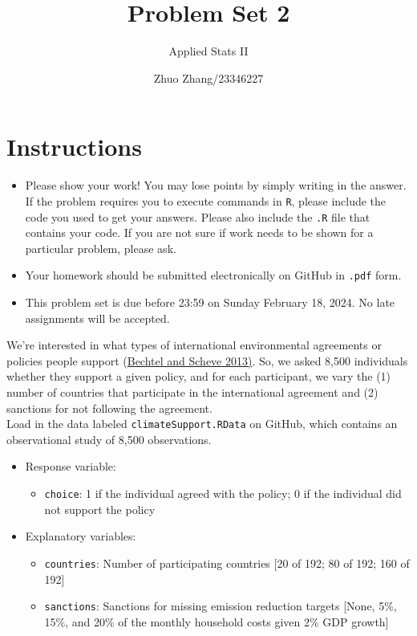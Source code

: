\documentclass[12pt,letterpaper]{article}
\title{Problem Set 2}
\date{Zhuo Zhang/23346227}
\author{Applied Stats II}
\begin{document}
	\maketitle
	\section*{Instructions}
	\begin{itemize}
		\item Please show your work! You may lose points by simply writing in the answer. If the problem requires you to execute commands in \texttt{R}, please include the code you used to get your answers. Please also include the \texttt{.R} file that contains your code. If you are not sure if work needs to be shown for a particular problem, please ask.
		\item Your homework should be submitted electronically on GitHub in \texttt{.pdf} form.
		\item This problem set is due before 23:59 on Sunday February 18, 2024. No late assignments will be accepted.
	\end{itemize}

	\vspace{.25cm}
\noindent We're interested in what types of international environmental agreements or policies people support (\href{https://www.pnas.org/content/110/34/13763}{Bechtel and Scheve 2013)}. So, we asked 8,500 individuals whether they support a given policy, and for each participant, we vary the (1) number of countries that participate in the international agreement and (2) sanctions for not following the agreement. \\

\noindent Load in the data labeled \texttt{climateSupport.RData} on GitHub, which contains an observational study of 8,500 observations.

\begin{itemize}
	\item
	Response variable: 
	\begin{itemize}
		\item \texttt{choice}: 1 if the individual agreed with the policy; 0 if the individual did not support the policy
	\end{itemize}
	\item
	Explanatory variables: 
	\begin{itemize}
		\item
		\texttt{countries}: Number of participating countries [20 of 192; 80 of 192; 160 of 192]
		\item
		\texttt{sanctions}: Sanctions for missing emission reduction targets [None, 5\%, 15\%, and 20\% of the monthly household costs given 2\% GDP growth]
		
	\end{itemize}
	
\end{itemize}
\end{document}
